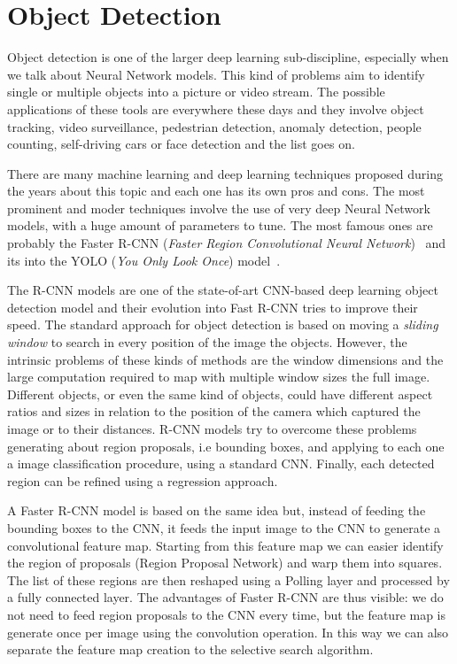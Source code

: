 \documentclass{standalone}
\begin{document}
\section[Object Detection]{Object Detection}\label{obj_detection:obj}

Object detection is one of the larger deep learning sub-discipline, especially when we talk about Neural Network models.
This kind of problems aim to identify single or multiple objects into a picture or video stream.
The possible applications of these tools are everywhere these days and they involve object tracking, video surveillance, pedestrian detection, anomaly detection, people counting, self-driving cars or face detection and the list goes on.

There are many machine learning and deep learning techniques proposed during the years about this topic and each one has its own pros and cons.
The most prominent and moder techniques involve the use of very deep Neural Network models, with a huge amount of parameters to tune.
The most famous ones are probably the Faster R-CNN (\emph{Faster Region Convolutional Neural Network})~\cite{ren2015faster} and its  into the YOLO (\emph{You Only Look Once}) model~\cite{redmon2015look, redmon2016yolo9000, redmon2018yolov3}.

The R-CNN models are one of the state-of-art CNN-based deep learning object detection model and their evolution into Fast R-CNN tries to improve their speed.
The standard approach for object detection is based on moving a \emph{sliding window} to search in every position of the image the objects.
However, the intrinsic problems of these kinds of methods are the window dimensions and the large computation required to map with multiple window sizes the full image.
Different objects, or even the same kind of objects, could have different aspect ratios and sizes in relation to the position of the camera which captured the image or to their distances.
R-CNN models try to overcome these problems generating about  region proposals, i.e bounding boxes, and applying to each one a image classification procedure, using a standard CNN.
Finally, each detected region can be refined using a regression approach.

A Faster R-CNN model is based on the same idea but, instead of feeding the bounding boxes to the CNN, it feeds the input image to the CNN to generate a convolutional feature map.
Starting from this feature map we can easier identify the region of proposals (Region Proposal Network) and warp them into squares.
The list of these regions are then reshaped using a Polling layer and processed by a fully connected layer.
The advantages of Faster R-CNN are thus visible: we do not need to feed  region proposals to the CNN every time, but the feature map is generate once per image using the convolution operation.
In this way we can also separate the feature map creation to the selective search algorithm.
\end{document}
